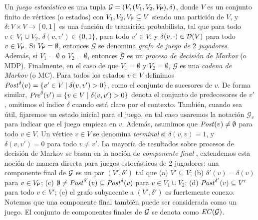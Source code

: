 Un \emph{juego estocástico} \cite{ChatterjeeH12,SvorenovaKwiatkowska16} es una tupla $\mathcal{G} = ( V,  (V_1, V_2, V_{\mathsf{P}}), \delta  ) $, donde $V$ es un conjunto finito de vértices (o estados) con $V_1, V_2, V_{\mathsf{P}} \subseteq V$ siendo una partición de $V$, y $\delta : V \times V \rightarrow [0,1]$ es una función de transición probabilista, tal que para todo $v \in V_1\cup V_2$, $\delta(v,v') \in  \{0,1\}$, para todo $v' \in V$; y $\delta(v,\cdot) \in \mathcal{D}(V)$ para todo $v \in V_{\mathsf{P}}$.
Si $V_{\mathsf{P}} = \emptyset$, entonces $\mathcal{G}$ se denomina \emph{grafo de juego de $2$ jugadores}. Además, si $V_1 = \emptyset$ o $V_2 = \emptyset$, entonces $\mathcal{G}$ es un \emph{proceso de decisión de Markov} (o MDP). Finalmente, en el caso de que $V_1= \emptyset$ y $V_2 = \emptyset$, $\mathcal{G}$ es una \emph{cadena de Markov} (o MC). Para todos los estados $v \in V$ definimos $\mathit{Post}^\delta(v) = \{v' \in V \mid \delta(v,v')>0 \}$, como el conjunto de sucesores de $v$. De forma similar, $\mathit{Pre}^\delta(v') = \{v \in V \mid \delta(v,v')>0 \}$ denota el conjunto de predecesores de $v'$, omitimos el índice $\delta$ cuando está claro por el contexto. También, cuando sea útil, fijaremos un estado inicial para el juego, en tal caso usaremos la notación $\mathcal{G}_v$ para indicar que el juego empieza en $v$. Además, asumimos que $\mathit{Post}(v) \neq \emptyset$ para todo
$v \in V$.
Un vértice $v \in V$ se denomina \emph{terminal} si $\delta(v,v) = 1$, y $\delta(v,v')=0$ para todo $v \neq v'$.
La mayoría de resultados sobre procesos de decisión de Markov se basan en la noción de \emph{componente final} \cite{BaierK08}, extendemos esta noción de manera directa para juegos estocásticos de 2 jugadores: una componente final de $\mathcal{G}$ es un par $(V',\delta')$ tal que (a) $V' \subseteq V$; (b) $\delta'(v) = \delta(v)$ para $v \in V_{\mathsf{P}}$; (c) $\emptyset \neq \mathit{Post}^{\delta'}(v) \subseteq \mathit{Post}^\delta(v)$ para $v \in V_1 \cup V_2$; (d) $\mathit{Post}^{\delta'}(v) \subseteq V'$ para todo $v \in V'$; (e) el grafo subyacente a $(V',\delta')$ es fuertemente conexo.  Notemos que una componente final también puede ser considerada como un juego. El conjunto de componentes finales de $\mathcal{G}$ se denota como $\mathit{EC}(\mathcal{G})$.
 
